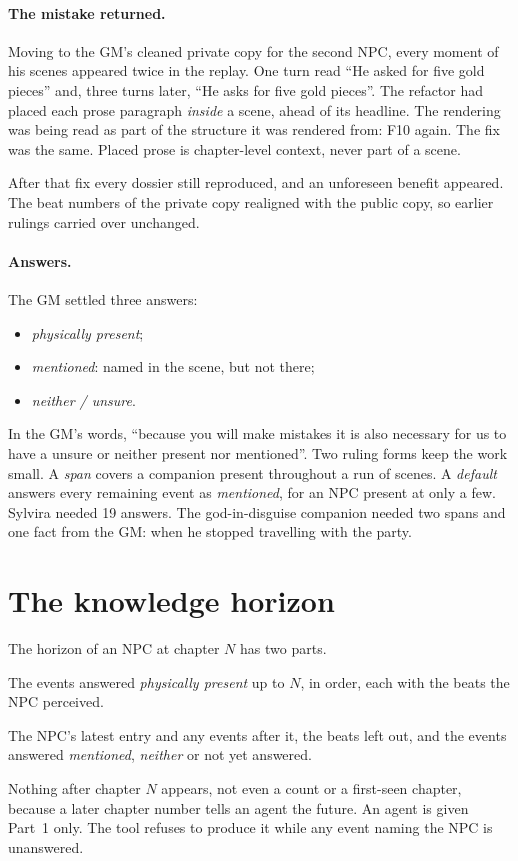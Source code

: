 \documentclass[11pt]{article}
\begin{document}
\paragraph{The mistake returned.}
Moving to the GM's cleaned private copy for the second NPC, every moment of his scenes
appeared twice in the replay. One turn read ``He asked for five gold pieces'' and,
three turns later, ``He asks for five gold pieces''. The refactor had placed each
prose paragraph \emph{inside} a scene, ahead of its headline. The rendering was being
read as part of the structure it was rendered from: F10 again. The fix was the same.
Placed prose is chapter-level context, never part of a scene.

After that fix every dossier still reproduced, and an unforeseen benefit appeared. The
beat numbers of the private copy realigned with the public copy, so earlier rulings
carried over unchanged.

\paragraph{Answers.}
The GM settled three answers:
\begin{itemize}[nosep]
\item \emph{physically present};
\item \emph{mentioned}: named in the scene, but not there;
\item \emph{neither / unsure}.
\end{itemize}
In the GM's words, ``because you will make mistakes it is also necessary for us to
have a unsure or neither present nor mentioned''. Two ruling forms keep the work small.
A \emph{span} covers a companion present throughout a run of scenes. A \emph{default}
answers every remaining event as \emph{mentioned}, for an NPC present at only a few.
Sylvira needed 19 answers. The god-in-disguise companion needed two spans and one fact
from the GM: when he stopped travelling with the party.

\section{The knowledge horizon}\label{sec:horizon}

The horizon of an NPC at chapter $N$ has two parts.
\begin{description}[nosep]
\item[Part 1: what the NPC could know.] The events answered \emph{physically present}
up to $N$, in order, each with the beats the NPC perceived.
\item[Part 2: for the GM only.] The NPC's latest entry and any events after it, the
beats left out, and the events answered \emph{mentioned}, \emph{neither} or not yet
answered.
\end{description}
Nothing after chapter $N$ appears, not even a count or a first-seen chapter, because a
later chapter number tells an agent the future. An agent is given Part~1 only. The
tool refuses to produce it while any event naming the NPC is unanswered.
\end{document}
